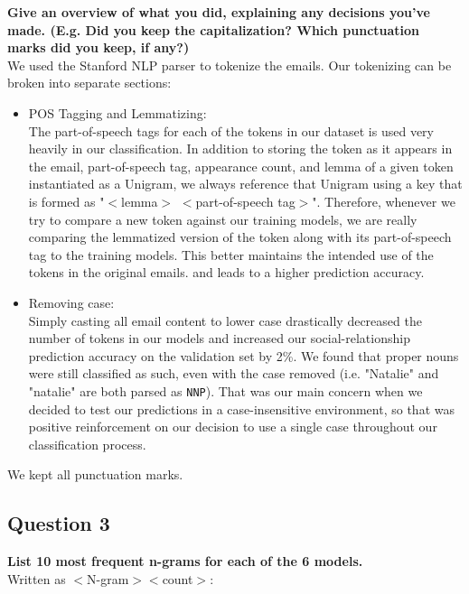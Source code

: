 \documentclass{article} %
\begin{document}
\textbf{Give an overview of what you did, explaining any decisions you've made. (E.g. Did you keep the capitalization? Which punctuation marks did you keep, if any?)}
\\


We used the Stanford NLP parser to tokenize the emails. Our tokenizing can be broken into separate sections:\\
\begin{itemize}
\item POS Tagging and Lemmatizing:\\
The part-of-speech tags for each of the tokens in our dataset is used very heavily in our classification. In addition to storing the token as it appears in the email, part-of-speech tag, appearance count, and lemma of a given token instantiated as a Unigram, we always reference that Unigram using a key that is formed as "$<$lemma$>$ $<$part-of-speech tag$>$". Therefore, whenever we try to compare a new token against our training models, we are really comparing the lemmatized version of the token along with its part-of-speech tag to the training models. This better maintains the intended use of the tokens in the original emails. and leads to a higher prediction accuracy.
\item Removing case:\\
Simply casting all email content to lower case drastically decreased the number of tokens in our models and increased our social-relationship prediction accuracy on the validation set by 2\%. We found that proper nouns were still classified as such, even with the case removed (i.e. "Natalie" and "natalie" are both parsed as \texttt{NNP}). That was our main concern when we decided to test our predictions in a case-insensitive environment, so that was positive reinforcement on our decision to use a single case throughout our classification process.
\end{itemize}

We kept all punctuation marks.

\subsection*{Question 3}

\textbf{List 10 most frequent n-grams for each of the 6 models.}
\\

Written as $<$N-gram$> <$count$>$:\\
\end{document}
